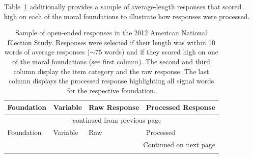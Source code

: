 \documentclass[12pt]{article}
\begin{document}
\begin{footnotesize}
Table~\ref{tab:sample} additionally provides a sample of average-length responses that scored high on each of the moral foundations to illustrate how responses were processed.

\begin{center}
\begin{longtable}{lp{1.5cm}p{5.5cm}p{5.5cm}}
\caption[Open-Ended Responses]{Sample of open-ended responses in the 2012 American National Election Study. Responses were selected if their length was within 10 words of average responses ($\sim75$ words) and if they scored high on one of the moral foundations (see first column). The second and third column display the item category and the raw response. The last column displays the processed response highlighting all signal words for the respective foundation.}\label{tab:sample} \\

\hline
	\textbf{Foundation} & \textbf{Variable} & Raw Response & Processed Response \\ \hline \endfirsthead
	
	\multicolumn{4}{c}{{\tablename\ \thetable{} -- continued from previous page}} \\
	\hline Foundation & Variable & Raw & Processed \\ \hline \endhead
	
	\hline \multicolumn{4}{r}{{Continued on next page}} \\	\endfoot
	
	\hline	\endlastfoot
	

\end{longtable}
\end{center}
\end{footnotesize}
\end{document}
